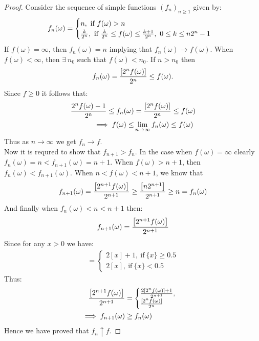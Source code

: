 \begin{proof}
  Consider the sequence of simple functions $(f_n)_{n\geq 1}$ given by:
  \begin{align*}
    f_n(\omega) = \begin{cases}
      n,\ \text{if}\ f(\omega) > n\\
      \frac{k}{2^n},\ \text{if}\ \frac{k}{2^n} \leq f(\omega) \leq \frac{k+1}{2^n},\ 0\leq k \leq n2^n -1
    \end{cases}
  \end{align*}
  If $f(\omega)= \infty$, then $f_n(\omega) = n$ implying that $f_n(\omega)\to f(\omega)$. When $f(\omega)<\infty$, then $\exists\ n_0$ such that $f(\omega) < n_0$. If $n>n_0$ then
  \begin{align*}
    f_n(\omega) = \frac{\left[2^n f(\omega)\right]}{2^n} \leq f(\omega). 
  \end{align*}
  Since $f\geq0$ it follows that:
  \begin{align*}
    \frac{2^n f(\omega)-1}{2^n}\leq f_n(\omega) &= \frac{\left[2^n f(\omega)\right]}{2^n} \leq f(\omega)\\
    \implies f(\omega) \leq &\lim_{n\to \infty}f_n(\omega) \leq f(\omega)
  \end{align*}
  Thus as $n\to\infty$ we get $f_n \to f$.\\

  Now it is requred to show that $f_{n+1}>f_n$. In the case when $f(\omega)=\infty$ clearly $f_n(\omega)=n<f_{n+1}(\omega) = n+1$. When $f(\omega)>n+1$, then $f_n(\omega)<f_{n+1}(\omega)$. When $n< f(\omega) < n+1$, we know that
  \[f_{n+1}(\omega)=\frac{\left[2^{n+1}f(\omega)\right]}{2^{n+1}}\geq \frac{\left[n2^{n+1}\right]}{2^{n+1}} \geq n = f_{n}(\omega)\]
  And finally when $f_n(\omega)<n<n+1$ then:
  \[f_{n+1}(\omega) = \frac{\left[2^{n+1}f(\omega)\right]}{2^{n+1}} \]
  Since for any $x>0$ we have:
  \begin{align*}
    [2x] = \begin{cases}
      2[x]+1,\ \text{if}\ \{x\}\geq0.5\\
      2[x],\ \text{if}\ \{x\}< 0.5
    \end{cases}
  \end{align*}
  Thus:
  \begin{align*}
    \frac{\left[2^{n+1}f(\omega)\right]}{2^{n+1}} &= \begin{cases}
        \frac{2\left[2^{n}f(\omega)\right]+1}{2^{n+1}},\\
        \frac{\left[2^{n}f(\omega)\right]}{2^{n}}
        \end{cases}\\
      \implies f_{n+1}(\omega) &\geq f_n(\omega)
  \end{align*}
  Hence we have proved that $f_n \uparrow f$.
\end{proof}
